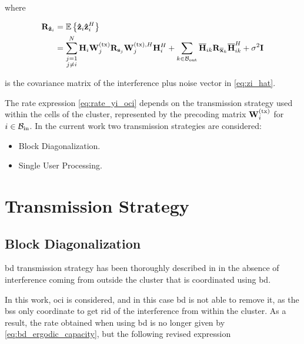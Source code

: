 \noindent
where

\begin{equation} \label{eq:zhat_cov}
\begin{aligned}
    \mathbf{R}_{\mathbf{\hat{z}}_i} &= \mathbb{E}\left\{\mathbf{\hat{z}}_i\mathbf{\hat{z}}_i^H\right\} \\
    &= \sum\limits_{\substack{j=1\\j\neq i}}^{N} \mathbf{H}_i \mathbf{W}^{(\text{tx})}_j \mathbf{R}_{\mathbf{s}_j}
    \mathbf{W}^{(\text{tx}),H}_j \mathbf{H}_i^H + \sum\limits_{k \in \mathcal{B}_{\text{out}}} \mathbf{\overline{H}}_{ik} \mathbf{R}_{\mathbf{\overline{x}}_k} 
    \mathbf{\overline{H}}_{ik}^H + \sigma^2\mathbf{I}
\end{aligned}
\end{equation}

\noindent
is the covariance matrix of the interference plus noise vector in
\eqref{eq:zi_hat}.

The rate expression \eqref{eq:rate_yi_oci} depends on the transmission strategy
used within the cells of the cluster, represented by the precoding matrix
$\mathbf{W}^{(\text{tx})}_i$ for $i \in \mathcal{B}_{\text{in}}$. In the current work two transmission strategies are
considered:

\begin{itemize}
    \item Block Diagonalization.
    \item Single User Processing.
\end{itemize}

\section{Transmission Strategy} \label{ssec:sched_strategy}

\subsection{Block Diagonalization} \label{ssec:sched_bd}

\gls{bd} transmission strategy has been thoroughly described in  in
the absence of interference coming from outside the cluster that is coordinated
using \gls{bd}.

In this work, \gls{oci} is considered, and in this case \gls{bd}
is not able to remove it, as the \glspl{bs} only coordinate to get rid of the
interference from within the cluster. As a result, the rate obtained when using
\gls{bd} is no longer given by \eqref{eq:bd_ergodic_capacity}, but the following
revised expression

